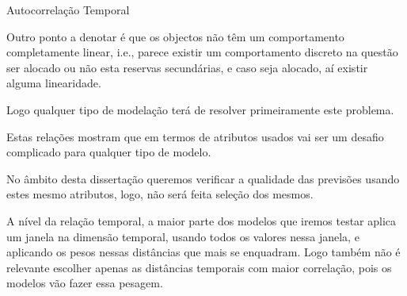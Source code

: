 \begin{table}[H]
  \caption{Autocorrelação Temporal}    
  \resizebox{\linewidth}{!}{}
  \label{tab:tempcorr}
  \end{table}

Outro ponto a denotar é que os objectos não têm um comportamento completamente linear, i.e., parece existir um comportamento discreto na questão ser alocado ou não esta reservas secundárias, e caso seja alocado, aí existir alguma linearidade.\par
Logo qualquer tipo de modelação terá de resolver primeiramente este problema.\par
Estas relações mostram que em termos de atributos usados vai ser um desafio complicado para qualquer tipo de modelo.\par
No âmbito desta dissertação queremos verificar a qualidade das previsões usando estes mesmo atributos, logo, não será feita seleção dos mesmos.\par
A nível da relação temporal, a maior parte dos modelos que iremos testar aplica um janela na dimensão temporal, usando todos os valores nessa janela, e aplicando os pesos nessas distâncias que mais se enquadram. Logo também não é relevante escolher apenas as distâncias temporais com maior correlação, pois os modelos vão fazer essa pesagem.\par


